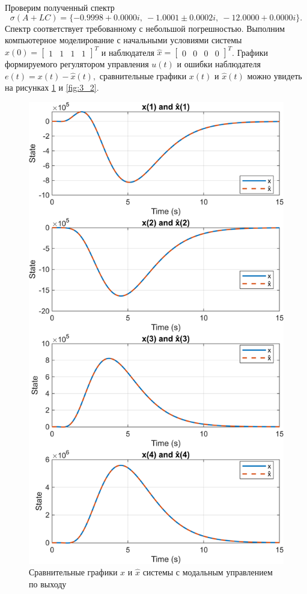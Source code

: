 Проверим полученный спектр
\begin{equation*}
    \sigma(A+LC)=\{-0.9998 + 0.0000i,\ 
    -1.0001 \pm 0.0002i,\ 
    -12.0000 + 0.0000i\}.
\end{equation*}
Спектр соответствует требованному с небольшой погрешностью.
Выполним компьютерное моделирование с начальными условиями системы 
$x(0) =\begin{bmatrix}
    1&1&1&1
\end{bmatrix}^T$ и наблюдателя $\hat x=\begin{bmatrix}
    0&0&0&0
\end{bmatrix}^T$. Графики формируемого 
регулятором управления $u(t)$ и ошибки наблюдателя $e(t) = x(t) - \hat x(t),$
сравнительные графики $x(t)$ и $\hat x(t)$ можно увидеть на рисунках \ref{fig:3_1}
и \ref{fig:3_2}.

\begin{figure}[H]
    \centering
    \includegraphics[width=0.8\linewidth]{figs/task3_1.png}
    \caption{Сравнительные графики $x$ и $\hat x$ системы с модальным 
    управлением по выходу}
    \label{fig:3_1}
\end{figure}

